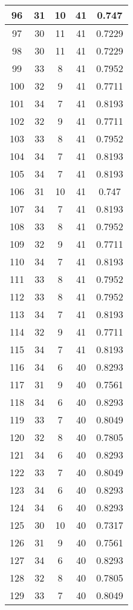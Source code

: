 \documentclass[letterpaper, 12pt]{article}
\begin{document}
\begin{longtable}{|c|c|c|c|c|}
\hline
96 & 31 & 10 & 41 & 0.747 \\
\hline
97 & 30 & 11 & 41 & 0.7229 \\
\hline
98 & 30 & 11 & 41 & 0.7229 \\
\hline
99 & 33 & 8 & 41 & 0.7952 \\
\hline
100 & 32 & 9 & 41 & 0.7711 \\
\hline
101 & 34 & 7 & 41 & 0.8193 \\
\hline
102 & 32 & 9 & 41 & 0.7711 \\
\hline
103 & 33 & 8 & 41 & 0.7952 \\
\hline
104 & 34 & 7 & 41 & 0.8193 \\
\hline
105 & 34 & 7 & 41 & 0.8193 \\
\hline
106 & 31 & 10 & 41 & 0.747 \\
\hline
107 & 34 & 7 & 41 & 0.8193 \\
\hline
108 & 33 & 8 & 41 & 0.7952 \\
\hline
109 & 32 & 9 & 41 & 0.7711 \\
\hline
110 & 34 & 7 & 41 & 0.8193 \\
\hline
111 & 33 & 8 & 41 & 0.7952 \\
\hline
112 & 33 & 8 & 41 & 0.7952 \\
\hline
113 & 34 & 7 & 41 & 0.8193 \\
\hline
114 & 32 & 9 & 41 & 0.7711 \\
\hline
115 & 34 & 7 & 41 & 0.8193 \\
\hline
116 & 34 & 6 & 40 & 0.8293 \\
\hline
117 & 31 & 9 & 40 & 0.7561 \\
\hline
118 & 34 & 6 & 40 & 0.8293 \\
\hline
119 & 33 & 7 & 40 & 0.8049 \\
\hline
120 & 32 & 8 & 40 & 0.7805 \\
\hline
121 & 34 & 6 & 40 & 0.8293 \\
\hline
122 & 33 & 7 & 40 & 0.8049 \\
\hline
123 & 34 & 6 & 40 & 0.8293 \\
\hline
124 & 34 & 6 & 40 & 0.8293 \\
\hline
125 & 30 & 10 & 40 & 0.7317 \\
\hline
126 & 31 & 9 & 40 & 0.7561 \\
\hline
127 & 34 & 6 & 40 & 0.8293 \\
\hline
128 & 32 & 8 & 40 & 0.7805 \\
\hline
129 & 33 & 7 & 40 & 0.8049 \\

\end{longtable}
\end{document}
